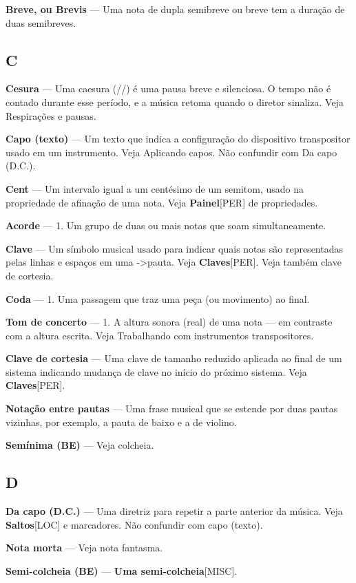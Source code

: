 \documentclass[a4paper,12pt]{article}
\begin{document}
\textbf{Breve, ou Brevis} --- Uma nota de dupla semibreve ou breve tem a duração de duas semibreves.

\subsection*{C}
\textbf{Cesura} --- Uma caesura (//) é uma pausa breve e silenciosa. O tempo não é contado durante esse período, e a música retoma quando o diretor sinaliza. Veja Respirações e pausas.

\textbf{Capo (texto)} --- Um texto que indica a configuração do dispositivo transpositor usado em um instrumento. Veja Aplicando capos. Não confundir com Da capo (D.C.).

\textbf{Cent} --- Um intervalo igual a um centésimo de um semitom, usado na propriedade de afinação de uma nota. Veja \textbf{Painel}\textsc{[PER]} de propriedades.

\textbf{Acorde} --- 1. Um grupo de duas ou mais notas que soam simultaneamente.

\textbf{Clave} --- Um símbolo musical usado para indicar quais notas são representadas pelas linhas e espaços em uma ->pauta. Veja \textbf{Claves}\textsc{[PER]}. Veja também clave de cortesia.

\textbf{Coda} --- 1. Uma passagem que traz uma peça (ou movimento) ao final.

\textbf{Tom de concerto} --- 1. A altura sonora (real) de uma nota --- em contraste com a altura escrita. Veja Trabalhando com instrumentos transpositores.

\textbf{Clave de cortesia} --- Uma clave de tamanho reduzido aplicada ao final de um sistema indicando mudança de clave no início do próximo sistema. Veja \textbf{Claves}\textsc{[PER]}.

\textbf{Notação entre pautas} --- Uma frase musical que se estende por duas pautas vizinhas, por exemplo, a pauta de baixo e a de violino.

\textbf{Semínima (BE)} --- Veja colcheia.

\subsection*{D}
\textbf{Da capo (D.C.)} --- Uma diretriz para repetir a parte anterior da música. Veja \textbf{Saltos}\textsc{[LOC]} e marcadores. Não confundir com capo (texto).

\textbf{Nota morta} --- Veja nota fantasma.

\textbf{Semi-colcheia (BE)} --- \textbf{Uma semi-colcheia}\textsc{[MISC]}.
\end{document}
